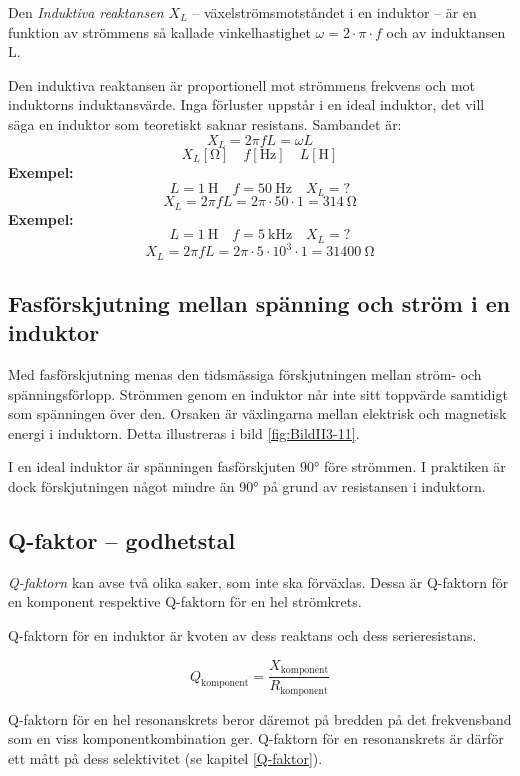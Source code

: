 Den \emph{Induktiva reaktansen \(X_L\)} -- växelströmsmotståndet i en induktor -- 
är en funktion av strömmens så kallade vinkelhastighet \(\omega = 2 \cdot \pi  \cdot f\)
och av induktansen L.

Den induktiva reaktansen är proportionell mot strömmens frekvens och mot
induktorns induktansvärde. Inga förluster uppstår i en ideal induktor, det vill säga 
en induktor som teoretiskt saknar resistans.
Sambandet är:
\[X_L = 2\pi fL = \omega L\]
\[X_L [\si{\ohm}] \quad f [\si{\hertz}] \quad L [\si{\henry}]\]
\textbf{Exempel:}
\[L = \SI{1}{\henry} \quad f = \SI{50}{\hertz} \quad X_L = ?\]
\[X_L = 2\pi fL = 2\pi \cdot 50 \cdot 1 = \SI{314}{\ohm}\]
\textbf{Exempel:}
\[L = \SI{1}{\henry} \quad f = \SI{5}{\kilo\hertz} \quad X_L = ?\]
\[X_L = 2\pi fL = 2\pi  \cdot 5 \cdot 10^3 \cdot 1 = \SI{31400}{\ohm}\]

\subsection{Fasförskjutning mellan spänning och ström i en induktor}

Med fasförskjutning menas den tidsmässiga förskjutningen mellan ström- och
spänningsförlopp. Strömmen genom en induktor når inte sitt toppvärde samtidigt
som spänningen över den. Orsaken är växlingarna mellan elektrisk och magnetisk
energi i induktorn.
Detta illustreras i bild \ref{fig:BildII3-11}.

I en ideal induktor är spänningen fasförskjuten \ang{90} före strömmen.
I praktiken är dock förskjutningen något mindre än \ang{90} på grund av
resistansen i induktorn.

\subsection{Q-faktor -- godhetstal}

\emph{Q-faktorn} kan avse två olika saker, som inte ska förväxlas.
Dessa är Q-faktorn för en komponent respektive Q-faktorn för en hel strömkrets.

Q-faktorn för en induktor är kvoten av dess reaktans och dess serieresistans.

\[Q_\text{komponent} = \dfrac{X_\text{komponent}}{R_\text{komponent}}\]

Q-faktorn för en hel resonanskrets beror däremot på bredden på det
frekvensband som en viss komponentkombination ger.
Q-faktorn för en resonanskrets är därför ett mått på dess
selektivitet (se kapitel \ref{Q-faktor}).

